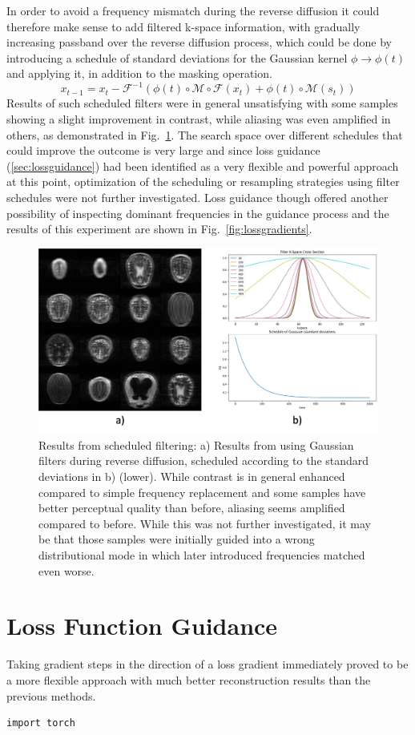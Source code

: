 In order to avoid a frequency mismatch during the reverse diffusion it could therefore make sense to add filtered k-space information, with gradually increasing passband over the reverse diffusion process, which could be done by introducing a schedule of standard deviations for the Gaussian kernel $\phi \rightarrow \phi(t)$ and applying it, in addition to the masking operation.
\begin{equation}
    x_{t-1} = x_t - \mathcal{F}^{-1}\left(\phi(t)\circ\mathcal{M}\circ\mathcal{F}(x_t) + \phi(t)\circ\mathcal{M}(s_t)\right)
\end{equation}
Results of such scheduled filters were in general unsatisfying with some samples showing a slight improvement in contrast, while aliasing was even amplified in others, as demonstrated in Fig.~\ref{fig:filtereddiffusion}. The search space over different schedules that could improve the outcome is very large and since loss guidance (\ref{sec:lossguidance}) had been identified as a very flexible and powerful approach at this point, optimization of the scheduling or resampling strategies using filter schedules were not further investigated. Loss guidance though offered another possibility of inspecting dominant frequencies in the guidance process and the results of this experiment are shown in Fig.~\ref{fig:lossgradients}.
\begin{figure}
    \centering
    \includegraphics[width=.5\textwidth]{images/filtereddiffusion.png}
    \caption[short]{Results from scheduled filtering: a) Results from using Gaussian filters during reverse diffusion, scheduled according to the standard deviations in b) (lower). While contrast is in general enhanced compared to simple frequency replacement and some samples have better perceptual quality than before, aliasing seems amplified compared to before. While this was not further investigated, it may be that those samples were initially guided into a wrong distributional mode in which later introduced frequencies matched even worse.}
    \label{fig:filtereddiffusion}
\end{figure}

\section{Loss Function Guidance}
Taking gradient steps in the direction of a loss gradient immediately proved to be a more flexible approach with much better reconstruction results than the previous methods.
\begin{lstlisting}[language=iPython, caption=My Caption will come here., float=htbp, label=lst:labsetuptomo]
    import torch
\end{lstlisting}

